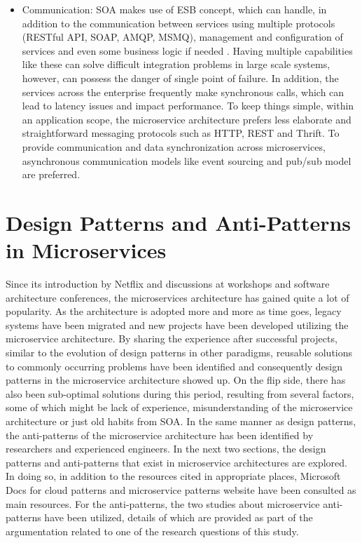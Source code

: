 \documentclass{Configuration_Files/PoliMi3i_thesis}
\begin{document}
\begin{itemize}
    \item Communication: SOA makes use of ESB concept, which can handle, in addition to the communication between services using multiple protocols (RESTful API, SOAP, AMQP, MSMQ), management and configuration of services and even some business logic if needed \cite{soa_comm}.
    Having multiple capabilities like these can solve difficult integration problems in large scale systems, however, can possess the danger of single point of failure.
    In addition, the services across the enterprise frequently make synchronous calls, which can lead to latency issues and impact performance.
    To keep things simple, within an application scope, the microservice architecture prefers less elaborate and straightforward  messaging protocols such as HTTP, REST and Thrift.
    To provide communication and data synchronization across microservices, asynchronous communication models like event sourcing and pub/sub model are preferred.
\end{itemize}

\section{Design Patterns and Anti-Patterns in Microservices}
\label{sec:patterns}

Since its introduction by Netflix and discussions at workshops and software architecture conferences, the microservices architecture has gained quite a lot of popularity.
As the architecture is adopted more and more as time goes, legacy systems have been migrated and new projects have been developed utilizing the microservice architecture.
By sharing the experience after successful projects, similar to the evolution of design patterns in other paradigms, reusable solutions to commonly occurring problems have been identified and consequently design patterns in the microservice architecture showed up.
On the flip side, there has also been sub-optimal solutions during this period, resulting from several factors, some of which might be lack of experience, misunderstanding of the microservice architecture or just old habits from SOA.
In the same manner as design patterns, the anti-patterns of the microservice architecture has been identified by researchers and experienced engineers.
In the next two sections, the design patterns and anti-patterns that exist in microservice architectures are explored.
In doing so, in addition to the resources cited in appropriate places, Microsoft Docs for cloud patterns \cite{microsoft_docs} and microservice patterns website \cite{microserviceIO} have been consulted as main resources.
For the anti-patterns, the two studies about microservice anti-patterns \cite{10.1145/3424771.3424812}\cite{9522227} have been utilized, details of which are provided as part of the argumentation related to one of the research questions of this study.
\end{document}
